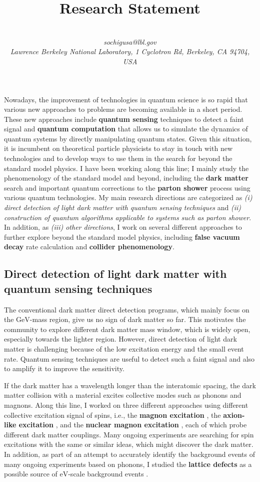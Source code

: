 \documentclass[12pt]{article}
\title{{\Large Research Statement}}
\author{
  \indent{\large So Chigusa}\\
  \indent\textit{sochigusa@lbl.gov}\\
  \indent\textit{Lawrence Berkeley National Laboratory, 1 Cyclotron Rd, Berkeley, CA 94704, USA}
}
\date{\vspace{-3em}}
\begin{document}
\maketitle

Nowadays, the improvement of technologies in quantum science is so rapid that various new approaches to problems are becoming available in a short period.
These new approaches include \textbf{quantum sensing} techniques to detect a faint signal and \textbf{quantum computation} that allows us to simulate the dynamics of quantum systems by directly manipulating quantum states.
Given this situation, it is incumbent on theoretical particle physicists to stay in touch with new technologies and to develop ways to use them in the search for beyond the standard model physics.
I have been working along this line; I mainly study the phenomenology of the standard model and beyond, including the \textbf{dark matter} search and important quantum corrections to the \textbf{parton shower} process using various quantum technologies. 
My main research directions are categorized as \textit{(i) direct detection of light dark matter with quantum sensing techniques} and \textit{(ii) construction of quantum algorithms applicable to systems such as parton shower}.
In addition, as \textit{(iii) other directions}, I work on several different approaches to further explore beyond the standard model physics, including \textbf{false vacuum decay} rate calculation and \textbf{collider phenomenology}.

\subsection*{Direct detection of light dark matter with quantum sensing techniques}

The conventional dark matter direct detection programs, which mainly focus on the $\mathrm{GeV}$-mass region, give us no sign of dark matter so far.
This motivates the community to explore different dark matter mass window, which is widely open, especially towards the lighter region.
However, direct detection of light dark matter is challenging because of the low excitation energy and the small event rate.
Quantum sensing techniques are useful to detect such a faint signal and also to amplify it to improve the sensitivity.

If the dark matter has a wavelength longer than the interatomic spacing, the dark matter collision with a material excites collective modes such as phonons and magnons.
Along this line, I worked on three different approaches using different collective excitation signal of spins, i.e., the \textbf{magnon excitation} \cite{Chigusa:2020gfs}, the \textbf{axion-like excitation} \cite{Chigusa:2021mci}, and the \textbf{nuclear magnon excitation} \cite{Chigusa:2023hmz}, each of which probe different dark matter couplings.
Many ongoing experiments are searching for spin excitations with the same or similar ideas, which might discover the dark matter.
In addition, as part of an attempt to accurately identify the background events of many ongoing experiments based on phonons, I studied the \textbf{lattice defects} as a possible source of $\mathrm{eV}$-scale background events \cite{Frenkel}.
\end{document}

